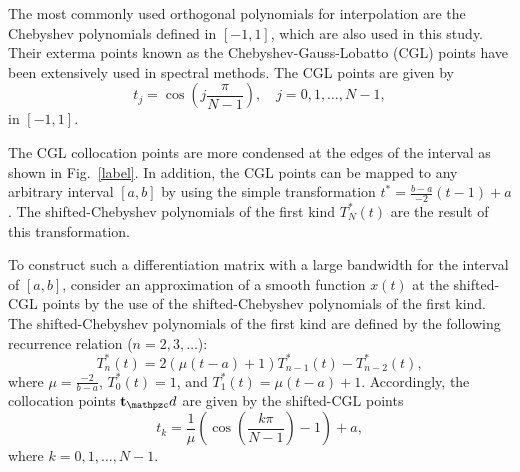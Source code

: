 \documentclass[journal]{IEEEtran}
\def \disc { \mathpzc d}
\newcommand{\parp}[1]{\left({#1}\right)}
\begin{document}
The most commonly used orthogonal polynomials for interpolation are the Chebyshev polynomials defined in $ [-1,1] $, which are also used in this study. Their exterma points known as the Chebyshev-Gauss-Lobatto (CGL) points have been extensively used in spectral methods. The CGL points are given by
\begin{equation}\label{eq:CGL}
	t_j = \cos(j\frac{\pi}{N-1}), \quad j = 0,1,\ldots,N-1 ,
\end{equation}
in $ \left[-1,1\right] $.

The CGL collocation points are more condensed at the edges of the interval as shown in Fig.~\ref{label}. In addition, the CGL points can be mapped to any arbitrary interval $ [a,b] $ by using the simple transformation $ t^*= \frac{b-a}{-2} (t-1)+a$. The shifted-Chebyshev polynomials of the first kind $ T^*_N(t) $ are the result of this transformation.

To construct such a differentiation matrix with a large bandwidth for the interval of $ [a,b] $, consider an approximation of a smooth function $ x(t) $ at the shifted-CGL points by the use of the shifted-Chebyshev polynomials of the first kind. The shifted-Chebyshev polynomials of the first kind are defined by the following recurrence relation ($ n=2,3,\ldots $):
\begin{equation}\label{eq:reccheb}
	T^*_n(t)=2\parp{		\mu(t-a) +1}T^*_{n-1}(t)-T^*_{n-2}(t),
\end{equation}
where $ \mu=\frac{-2}{b-a} $, $ T^*_0(t)=1 $, and $ T^*_1(t)=		\mu(t-a) +1$. Accordingly, the collocation points $ \mathbf t_\disc $ are given by the shifted-CGL points
\begin{equation}\label{key}
	{{t}_{k}}=\frac{1}{		\mu}\parp{\cos \left( \frac{k\pi }{N-1} \right)-1} +a,
\end{equation}
where $  k=0,1,\ldots,N-1 $.
\end{document}
